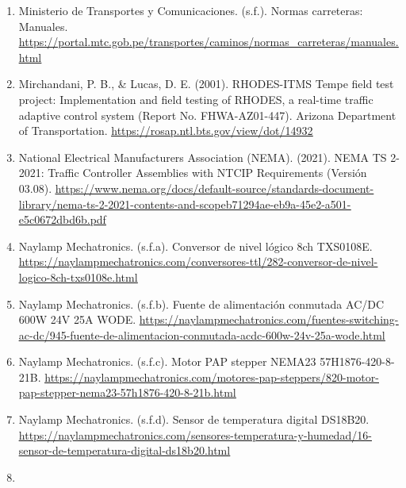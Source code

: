 \documentclass[12pt,a4paper,oneside]{report}
\providecommand{\ul}[1]{\underline{#1}}
\begin{document}
\begin{enumerate}
\item
  Ministerio de Transportes y Comunicaciones. (s.f.). Normas carreteras: Manuales. \href{https://portal.mtc.gob.pe/transportes/caminos/normas_carreteras/manuales.html}{\ul{https://portal.mtc.gob.pe/transportes/caminos/normas\_carreteras/manuales.html}}
\item
  Mirchandani, P. B., \& Lucas, D. E. (2001). RHODES-ITMS Tempe field test project: Implementation and field testing of RHODES, a real-time traffic adaptive control system (Report No. FHWA-AZ01-447). Arizona Department of Transportation. \href{https://rosap.ntl.bts.gov/view/dot/14932}{\ul{https://rosap.ntl.bts.gov/view/dot/14932}}
\item
  National Electrical Manufacturers Association (NEMA). (2021). NEMA TS 2-2021: Traffic Controller Assemblies with NTCIP Requirements (Versión 03.08). \href{https://www.nema.org/docs/default-source/standards-document-library/nema-ts-2-2021-contents-and-scopeb71294ae-eb9a-45e2-a501-e5c0672dbd6b.pdf}{\ul{https://www.nema.org/docs/default-source/standards-document-library/nema-ts-2-2021-contents-and-scopeb71294ae-eb9a-45e2-a501-e5c0672dbd6b.pdf}}
\item
  Naylamp Mechatronics. (s.f.a). Conversor de nivel lógico 8ch TXS0108E. \href{https://naylampmechatronics.com/conversores-ttl/282-conversor-de-nivel-logico-8ch-txs0108e.html}{\ul{https://naylampmechatronics.com/conversores-ttl/282-conversor-de-nivel-logico-8ch-txs0108e.html}}
\item
  Naylamp Mechatronics. (s.f.b). Fuente de alimentación conmutada AC/DC 600W 24V 25A WODE. \href{https://naylampmechatronics.com/fuentes-switching-ac-dc/945-fuente-de-alimentacion-conmutada-acdc-600w-24v-25a-wode.html}{\ul{https://naylampmechatronics.com/fuentes-switching-ac-dc/945-fuente-de-alimentacion-conmutada-acdc-600w-24v-25a-wode.html}}
\item
  Naylamp Mechatronics. (s.f.c). Motor PAP stepper NEMA23 57H1876-420-8-21B. \href{https://naylampmechatronics.com/motores-pap-steppers/820-motor-pap-stepper-nema23-57h1876-420-8-21b.html}{\ul{https://naylampmechatronics.com/motores-pap-steppers/820-motor-pap-stepper-nema23-57h1876-420-8-21b.html}}
\item
  Naylamp Mechatronics. (s.f.d). Sensor de temperatura digital DS18B20. \href{https://naylampmechatronics.com/sensores-temperatura-y-humedad/16-sensor-de-temperatura-digital-ds18b20.html}{\ul{https://naylampmechatronics.com/sensores-temperatura-y-humedad/16-sensor-de-temperatura-digital-ds18b20.html}}
\item

\end{enumerate}
\end{document}
